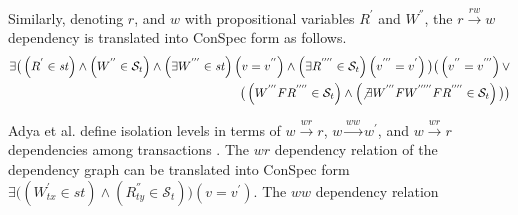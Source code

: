 \documentclass[acmlarge, ,11pt]{acmart}
\begin{document}
   Similarly, denoting  $r$, and $w$ with propositional variables $R^{'}$ and $W^{''}$, the
   $r \xrightarrow{rw} w$ dependency is translated into ConSpec form as follows.
     \begin{align}\label{eqn:rw}
\begin{split}
\exists \big( %
\left( {R}^{'} \in \mathit{st} \right)
   \wedge \left( {W}^{''}  \in  \mathcal{S}_t \right) \wedge
   \left( \exists  {W}^{'''} \in \mathit{st}  \right)
   \left( v = {v}^{''} \right) \wedge
  \left( \exists {R}^{''''} \in \mathcal{S}_t  \right) \left( {v}^{'''} = {v}^{'} \right)  \big)
 \big( \left( {v}^{''} = {v}^{'''} \right) \vee \\
  \big(  \left( {W}^{'''} F { R}^{''''} \in \mathcal{S}_t \right) \wedge
    \left(  \not\exists {W}^{'''} F {W}^{'''''} F { R}^{''''} \in \mathcal{S}_t  \right) \big) \big)
  \end{split}
  \end{align}
   \par Adya et al. define isolation  levels in terms of $w \xrightarrow{wr} r$,
   $w \xrightarrow{ww} w^{'}$, and  $w \xrightarrow{wr} r$  dependencies among transactions
   \cite{DBLP:conf/icde/AdyaLO00}. The $wr$ dependency relation of the dependency graph can be translated into
   ConSpec form $\exists \big( %
   \left( W^{'}_\mathit{tx} \in \mathit{st} \right)
  \wedge \left(  R^{''}_\mathit{ty} \in \mathcal{S}_t \right) \big) \left( v = {v}^{'} \right) $. The $ww$ dependency relation
\end{document}
